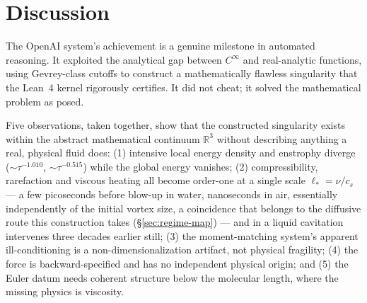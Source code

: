 \documentclass[11pt,a4paper]{article}
\begin{document}
\section{Discussion}

The OpenAI system's achievement is a genuine milestone in automated reasoning. It exploited the
analytical gap between $C^\infty$ and real-analytic functions, using Gevrey-class cutoffs to
construct a mathematically flawless singularity that the Lean~4 kernel rigorously certifies. It did
not cheat; it solved the mathematical problem as posed.

Five observations, taken together, show that the constructed singularity exists within the
abstract mathematical continuum $\mathbb{R}^3$ without describing anything a real, physical fluid
does: (1) intensive local energy density and enstrophy diverge ($\sim\tau^{-1.010}$,
$\sim\tau^{-0.515}$) while the global energy vanishes; (2) compressibility, rarefaction and viscous
heating all become order-one at a single scale $\ell_*=\nu/c_s$ --- a few picoseconds before blow-up
in water, nanoseconds in air, essentially independently of the initial vortex size, a coincidence
that belongs to the diffusive route this construction takes (\S\ref{sec:regime-map}) --- and in a
liquid cavitation intervenes three decades earlier still; (3) the moment-matching system's apparent
ill-conditioning is a non-dimensionalization artifact, not physical fragility; (4) the force is
backward-specified and has no independent physical origin; and (5) the Euler datum needs coherent
structure below the molecular length, where the missing physics is viscosity.
\end{document}
